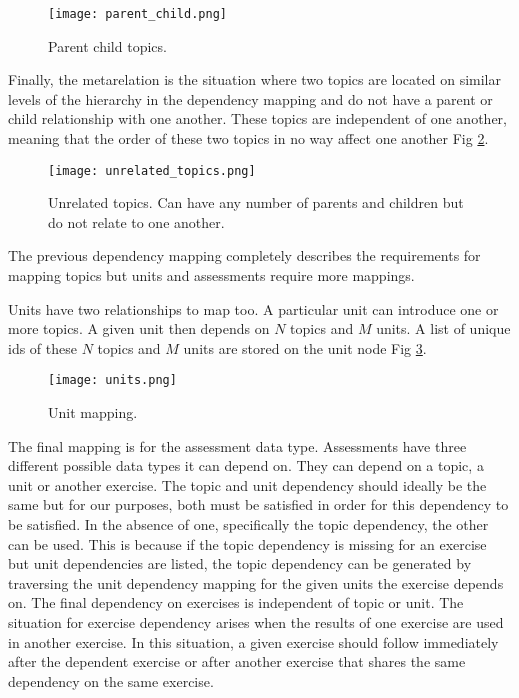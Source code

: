 \begin{figure}[ht]
    \centering
    \texttt{[image: parent\_child.png]}
    \caption[parent child topic.]{Parent child topics.}

    \label{fig:parent_child}
\end{figure}

Finally, the metarelation is the situation where two topics are located on similar levels of the hierarchy in the dependency mapping and do not have a parent or child relationship with one another. These topics are independent of one another, meaning that the order of these two topics in no way affect one another Fig \ref{fig:unrelated_topics}.

\pagebreak
\begin{figure}[ht]
    \centering
    \texttt{[image: unrelated\_topics.png]}
    \caption[Unrelated topics.]{Unrelated topics. Can have any number of parents and children but do not relate to one another.}
        
    \label{fig:unrelated_topics}
\end{figure}

The previous dependency mapping completely describes the requirements for mapping topics but units and assessments require more mappings.

Units have two relationships to map too. A particular unit can introduce one or more topics. A given unit then depends on $N$ topics and $M$ units. A list of unique ids of these $N$ topics and $M$ units are stored on the unit node Fig \ref{fig:units}.

\begin{figure}[ht]
    \centering
    \texttt{[image: units.png]}
    \caption[Unit mapping.]{Unit mapping.}
        
    \label{fig:units}
\end{figure}

The final mapping is for the assessment data type. Assessments have three different possible data types it can depend on. They can depend on a topic, a unit or another exercise. The topic and unit dependency should ideally be the same but for our purposes, both must be satisfied in order for this dependency to be satisfied. In the absence of one, specifically the topic dependency, the other can be used. This is because if the topic dependency is missing for an exercise but unit dependencies are listed, the topic dependency can be generated by traversing the unit dependency mapping for the given units the exercise depends on. The final dependency on exercises is independent of topic or unit. The situation for exercise dependency arises when the results of one exercise are used in another exercise. In this situation, a given exercise should follow immediately after the dependent exercise or after another exercise that shares the same dependency on the same exercise.

